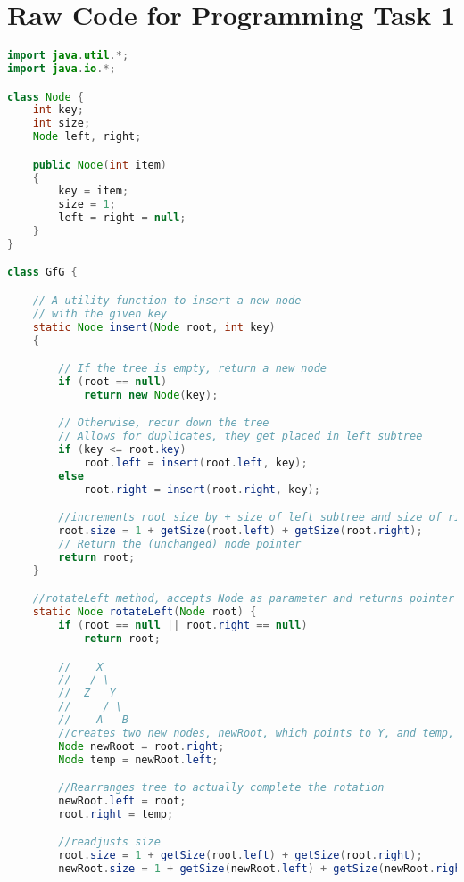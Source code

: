 \documentclass[11pt]{article}
\begin{document}
\section*{Raw Code for Programming Task 1 }
\lstset{
    basicstyle=\ttfamily\footnotesize,
    breaklines=true,  %
    frame=single,     %
    numbers=left,     %
    tabsize=4,        %
    showstringspaces=false %
}
\begin{lstlisting}[language=Java]
import java.util.*;
import java.io.*;

class Node {
    int key;
    int size;
    Node left, right;

    public Node(int item)
    {
        key = item;
        size = 1;
        left = right = null;
    }
}

class GfG {

    // A utility function to insert a new node
    // with the given key
    static Node insert(Node root, int key)
    {

        // If the tree is empty, return a new node
        if (root == null)
            return new Node(key);

        // Otherwise, recur down the tree
        // Allows for duplicates, they get placed in left subtree
        if (key <= root.key)
            root.left = insert(root.left, key);
        else
            root.right = insert(root.right, key);

        //increments root size by + size of left subtree and size of right subtree
        root.size = 1 + getSize(root.left) + getSize(root.right);
        // Return the (unchanged) node pointer
        return root;
    }

    //rotateLeft method, accepts Node as parameter and returns pointer to new root after rotation
    static Node rotateLeft(Node root) {
        if (root == null || root.right == null)
            return root;

        //    X
        //   / \
        //  Z   Y
        //     / \
        //    A   B
        //creates two new nodes, newRoot, which points to Y, and temp, which points to A and will become X.right after rotation
        Node newRoot = root.right;
        Node temp = newRoot.left;

        //Rearranges tree to actually complete the rotation
        newRoot.left = root;
        root.right = temp;

        //readjusts size
        root.size = 1 + getSize(root.left) + getSize(root.right);
        newRoot.size = 1 + getSize(newRoot.left) + getSize(newRoot.right);



\end{lstlisting}
\end{document}
